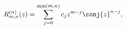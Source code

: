 \[\mathop{R^{(\alpha)}_{m,n}\/}\nolimits\!\left(z\right)=\sum_{j=0}^{\min(m,n)}c%
_{j}z^{m-j}\conj{z}^{n-j},\]